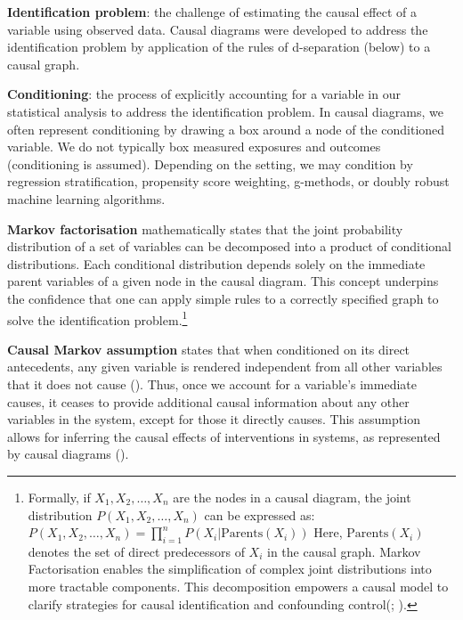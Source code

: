 \documentclass[
  singlecolumn,
  9pt]{article}
\begin{document}
\textbf{Identification problem}: the challenge of estimating the causal
effect of a variable using observed data. Causal diagrams were developed
to address the identification problem by application of the rules of
d-separation (below) to a causal graph.

\textbf{Conditioning}: the process of explicitly accounting for a
variable in our statistical analysis to address the identification
problem. In causal diagrams, we often represent conditioning by drawing
a box around a node of the conditioned variable. We do not typically box
measured exposures and outcomes (conditioning is assumed). Depending on
the setting, we may condition by regression stratification, propensity
score weighting, g-methods, or doubly robust machine learning
algorithms.

\textbf{Markov factorisation} mathematically states that the joint
probability distribution of a set of variables can be decomposed into a
product of conditional distributions. Each conditional distribution
depends solely on the immediate parent variables of a given node in the
causal diagram. This concept underpins the confidence that one can apply
simple rules to a correctly specified graph to solve the identification
problem.\footnote{Formally, if \(X_1, X_2, \ldots, X_n\) are the nodes
  in a causal diagram, the joint distribution
  \(P(X_1, X_2, \ldots, X_n)\) can be expressed as:
  \(P(X_1, X_2, \ldots, X_n) = \prod_{i=1}^{n} P(X_i | \text{Parents}(X_i))\)
  Here, \(\text{Parents}(X_i)\) denotes the set of direct predecessors
  of \(X_i\) in the causal graph. Markov Factorisation enables the
  simplification of complex joint distributions into more tractable
  components. This decomposition empowers a causal model to clarify
  strategies for causal identification and confounding
  control(;
  ).}

\textbf{Causal Markov assumption} states that when conditioned on its
direct antecedents, any given variable is rendered independent from all
other variables that it does not cause (). Thus, once we account for a variable's immediate
causes, it ceases to provide additional causal information about any
other variables in the system, except for those it directly causes. This
assumption allows for inferring the causal effects of interventions in
systems, as represented by causal diagrams
().
\end{document}
